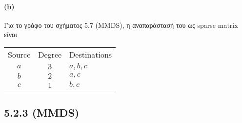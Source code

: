 \documentclass[a4paper,11pt]{article}
\begin{document}
\paragraph{(b)} Για το γράφο του σχήματος 5.7 (MMDS), η αναπαράστασή του ως sparse matrix είναι
\begin{center}
	\begin{tabular}{| c | c | l |}
		\hline
		Source & Degree & Destinations \\ \hhline{|=|=|=|}
		$a$ & $3$ & $a,b,c$ \\
		$b$ & $2$ & $a,c$ \\
		$c$ & $1$ & $b,c$ \\
		\hline
	\end{tabular}
\end{center}

\subsection*{5.2.3 (MMDS)}
\end{document}

